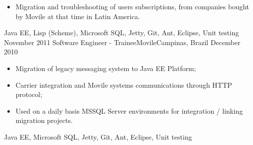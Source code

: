 \begin{experiences}
{\begin{itemize}
             used by Movile's Mobile Billing and Messaging systems;
            \item Migration and troubleshooting of users subscriptions, from companies bought by Movile at that time in Latin America.\\
          \end{itemize}
        }{Java EE, Lisp (Scheme), Microsoft SQL, Jetty, Git, Ant, Eclipse, Unit testing}
  \emptySeparator
  \experience
  {November 2011} {Software Engineer - Trainee}{Movile}{Campinas, Brazil}
  {December 2010}
        {
          \begin{itemize}
            \item Migration of legacy messaging system to Java EE Platform;
            \item Carrier integration and Movile systems communications through HTTP protocol;
            \item Used on a daily basis MSSQL Server environments for integration / linking migration projects.\\
          \end{itemize}
        }{Java EE, Microsoft SQL, Jetty, Git, Ant, Eclipse, Unit testing}
\end{experiences}

